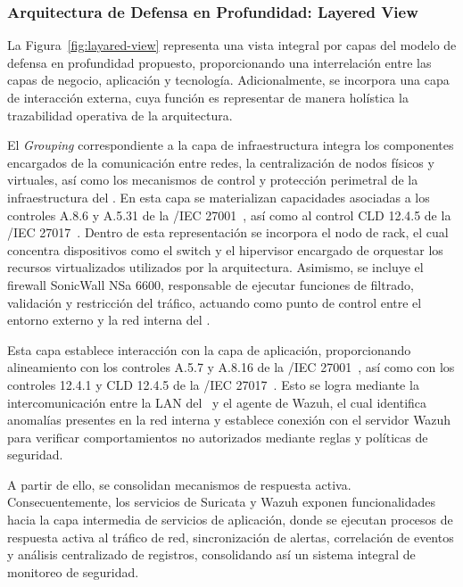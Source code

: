 \subsubsection{Arquitectura de Defensa en Profundidad: Layered View}

La Figura~\ref{fig:layared-view} representa una vista integral por capas del modelo de defensa en profundidad propuesto, proporcionando una interrelación entre 
las capas de negocio, aplicación y tecnología. Adicionalmente, se incorpora una capa de interacción externa, cuya función es representar de 
manera holística la trazabilidad operativa de la arquitectura.

El \textit{Grouping} correspondiente a la capa de infraestructura integra los componentes encargados de la comunicación entre redes, la 
centralización de nodos físicos y virtuales, así como los mecanismos de control y protección perimetral de la infraestructura del \GRID. 
En esta capa se materializan capacidades asociadas a los controles A.8.6 y A.5.31 de la \ISO/IEC 27001~\cite{iso27001}, así como al control 
CLD 12.4.5 de la \ISO/IEC 27017~\cite{iso27017}. Dentro de esta representación se incorpora el nodo de rack, el cual concentra dispositivos 
como el switch y el hipervisor encargado de orquestar los recursos virtualizados utilizados por la arquitectura. Asimismo, se incluye el 
firewall SonicWall NSa 6600, responsable de ejecutar funciones de filtrado, validación y restricción del tráfico, actuando como punto de 
control entre el entorno externo y la red interna del \GRID.

Esta capa establece interacción con la capa de aplicación, proporcionando alineamiento con los controles A.5.7 y A.8.16 de la \ISO/IEC 
27001~\cite{iso27001}, así como con los controles 12.4.1 y CLD 12.4.5 de la \ISO/IEC 27017~\cite{iso27017}. Esto se logra mediante la 
intercomunicación entre la LAN del \GRID\ y el agente de Wazuh, el cual identifica anomalías presentes en la red interna y establece 
conexión con el servidor Wazuh para verificar comportamientos no autorizados mediante reglas y políticas de seguridad.

A partir de ello, se consolidan mecanismos de respuesta activa. Consecuentemente, los servicios de Suricata y Wazuh exponen funcionalidades 
hacia la capa intermedia de servicios de aplicación, donde se ejecutan procesos de respuesta activa al tráfico de red, sincronización de 
alertas, correlación de eventos y análisis centralizado de registros, consolidando así un sistema integral de monitoreo de seguridad.

